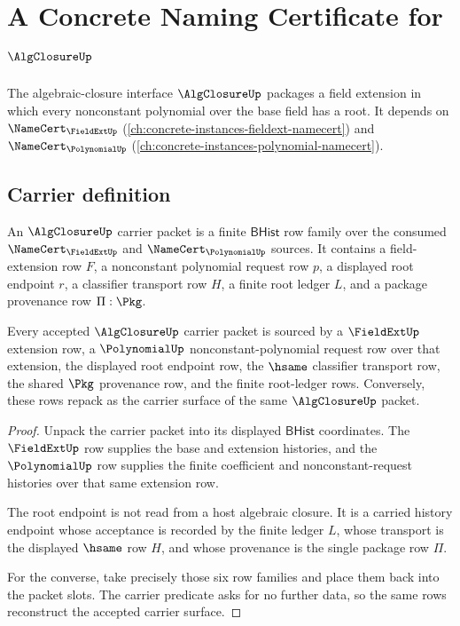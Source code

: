 \chapter{A Concrete Naming Certificate for $\AlgClosureUp$}
\label{ch:concrete-instances-algclosure-namecert}

The algebraic-closure interface $\AlgClosureUp$ packages a field extension in which every nonconstant polynomial over the base field has a root. It depends on $\NameCert_{\FieldExtUp}$ (\autoref{ch:concrete-instances-fieldext-namecert}) and $\NameCert_{\PolynomialUp}$ (\autoref{ch:concrete-instances-polynomial-namecert}).

\section{Carrier definition}
\label{sec:algclosure-carrier}

An $\AlgClosureUp$ carrier packet is a finite $\mathsf{BHist}$ row family over
the consumed $\NameCert_{\FieldExtUp}$ and $\NameCert_{\PolynomialUp}$ sources.
It contains a field-extension row $F$, a nonconstant polynomial request row $p$,
a displayed root endpoint $r$, a classifier transport row $H$, a finite root
ledger $L$, and a package provenance row $\Pi:\Pkg$.

\begin{theorem}
\label{thm:algclosure-carrier-source-obligation}
Every accepted $\AlgClosureUp$ carrier packet is sourced by a
$\FieldExtUp$ extension row, a $\PolynomialUp$ nonconstant-polynomial request
row over that extension, the displayed root endpoint row, the $\hsame$
classifier transport row, the shared $\Pkg$ provenance row, and the finite
root-ledger rows. Conversely, these rows repack as the carrier surface of the
same $\AlgClosureUp$ packet.
\end{theorem}
\begin{proof}
Unpack the carrier packet into its displayed $\mathsf{BHist}$ coordinates. The
$\FieldExtUp$ row supplies the base and extension histories, and the
$\PolynomialUp$ row supplies the finite coefficient and nonconstant-request
histories over that same extension row.

The root endpoint is not read from a host algebraic closure. It is a carried
history endpoint whose acceptance is recorded by the finite ledger $L$, whose
transport is the displayed $\hsame$ row $H$, and whose provenance is the single
package row $\Pi$.

For the converse, take precisely those six row families and place them back
into the packet slots. The carrier predicate asks for no further data, so the
same rows reconstruct the accepted carrier surface.
\end{proof}

